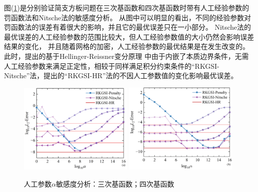 图(\ref{Ralpha})是分别验证简支方板问题在三次基函数和四次基函数时带有人工经验参数的罚函数法和Nitsche法的敏感度分析。
从图中可以明显的看出，不同的经验参数对罚函数法的误差有着很大的影响，并且它的最优误差只在一小部分。
Nitsche法的最优误差的人工经验参数的范围比较大，但人工经验参数值的大小仍然会影响误差结果的变化，
并且随着网格的加密，人工经验参数的最优结果是在发生改变的。此时，提出的基于Hellinger-Reissner变分原理
中由于内嵌了本质边界条件，无需人工经验参数来满足正定性，相较于同样满足积分约束条件的“RKGSI-Nitsche”法，提出的“RKGSI-HR”法的不因人工参数值的变化影响最优误差。
\begin{figure}[H]
    \centering
    \begin{subcaptiongroup}
    \includegraphics[width=0.49\textwidth]{figure/PHR/R/calpha.png}
    \label{calpha}
    \includegraphics[width=0.49\textwidth]{figure/PHR/R/qalpha.png}
    \label{qalpha}
    \end{subcaptiongroup}
\caption{人工参数$\alpha$敏感度分析：三次基函数；四次基函数}
\label{Ralpha}
\end{figure}
\newpage
